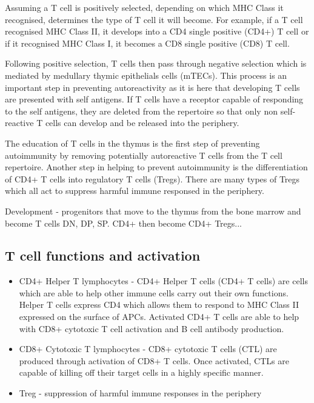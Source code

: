 Assuming a T cell is positively selected, depending on which MHC Class it recognised, determines the type of T cell it will become.
For example, if a T cell recognised MHC Class II, it develops into a CD4 single positive (CD4+) T cell or if it recognised MHC Class I, it becomes a CD8 single positive (CD8) T cell.

Following positive selection, T cells then pass through negative selection which is mediated by medullary thymic epithelials cells (mTECs).
This process is an important step in preventing autoreactivity as it is here that developing T cells are presented with self antigens.
If T cells have a receptor capable of responding to the self antigens, they are deleted from the repertoire so that only non self-reactive T cells can develop and be released into the periphery.

The education of T cells in the thymus is the first step of preventing autoimmunity by removing potentially autoreactive T cells from the T cell repertoire.
Another step in helping to prevent autoimmunity is the differentiation of CD4+ T cells into regulatory T cells (Tregs).
There are many types of Tregs which all act to suppress harmful immune responsed in the periphery.


Development - progenitors that move to the thymus from the bone marrow and become T cells
DN, DP, SP.
CD4+ then become CD4+ Tregs...


\subsection{T cell functions and activation}

\begin{itemize}
\item CD4+ Helper T lymphocytes - CD4+ Helper T cells (CD4+ T cells) are cells which are able to help other immune cells carry out their own functions. 
Helper T cells express CD4 which allows them to respond to MHC Class II expressed on the surface of APCs. 
Activated CD4+ T cells are able to help with CD8+ cytotoxic T cell activation and B cell antibody production.
\item CD8+ Cytotoxic T lymphocytes - CD8+ cytotoxic T cells (CTL) are produced through activation of CD8+ T cells.
Once activated, CTLs are capable of killing off their target cells in a highly specific manner.
\item Treg - suppression of harmful immune responses in the periphery
\end{itemize}



